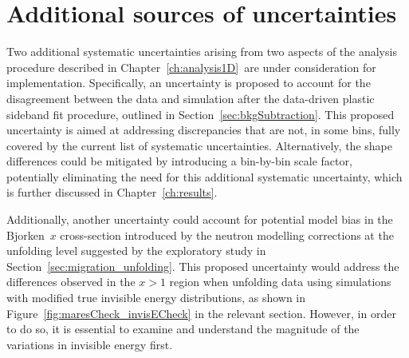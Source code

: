 \section{Additional sources of uncertainties}

Two additional systematic uncertainties arising from two aspects of the analysis procedure described in Chapter~\ref{ch:analysis1D}~are under consideration for implementation. Specifically, an uncertainty is proposed to account for the disagreement between the data and simulation after the data-driven plastic sideband fit procedure, outlined in Section~\ref{sec:bkgSubtraction}. This proposed uncertainty is aimed at addressing discrepancies that are not, in some bins, fully covered by the current list of systematic uncertainties. Alternatively, the shape differences could be mitigated by introducing a bin-by-bin scale factor, potentially eliminating the need for this additional systematic uncertainty, which is further discussed in Chapter~\ref{ch:results}.

Additionally, another uncertainty could account for potential model bias in the Bjor\-ken~$x$ cross-section introduced by the neutron modelling corrections at the unfolding level suggested by the exploratory study in Section~\ref{sec:migration_unfolding}. This proposed uncertainty would address the differences observed in the $x > 1$ region when unfolding data using simulations with modified true invisible energy distributions, as shown in Figure~\ref{fig:maresCheck_invisECheck} in the relevant section.\enlargethispage{1.5\baselineskip} However, in order to do so, it is essential to examine and understand the magnitude of the variations in invisible energy first. 